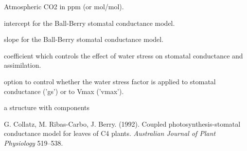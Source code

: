 \documentclass[letterpaper]{book}
\begin{document}
\begin{Arguments}
\begin{ldescription}
\item[\code{Catm}] Atmospheric CO2 in ppm (or
\eqn{\mu}{}mol/mol).

\item[\code{b0}] intercept for the Ball-Berry stomatal
conductance model.

\item[\code{b1}] slope for the Ball-Berry stomatal conductance
model.

\item[\code{StomWS}] coefficient which controls the effect of
water stress on stomatal conductance and assimilation.

\item[\code{ws}] option to control whether the water stress
factor is applied to stomatal conductance ('gs') or to
Vmax ('vmax').
\end{ldescription}
\end{Arguments}
%
\begin{Value}
a  structure with components
\end{Value}
%
\begin{References}\relax
G. Collatz, M. Ribas-Carbo, J. Berry. (1992).  Coupled
photosynthesis-stomatal conductance model for leaves of
C4 plants. \emph{Australian Journal of Plant Physiology}
519--538.
\end{References}
%
\begin{SeeAlso}\relax
{}
\end{SeeAlso}
%
\end{document}
